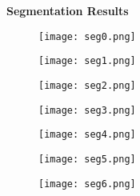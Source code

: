 \documentclass[conference]{IEEEtran}
\begin{document}
\section{}{\textbf{Segmentation Results}}

\begin{figure}[ht!]
    \centering
    \texttt{[image: seg0.png]}
\end{figure}

\begin{figure}[ht!]
    \centering
    \texttt{[image: seg1.png]}
\end{figure}

\begin{figure}[ht!]
    \centering
    \texttt{[image: seg2.png]}
\end{figure}
\begin{figure}[ht!]
    \centering
    \texttt{[image: seg3.png]}
\end{figure}
\begin{figure}[ht!]
    \centering
    \texttt{[image: seg4.png]}
\end{figure}
\begin{figure}[ht!]
    \centering
    \texttt{[image: seg5.png]}
\end{figure}
\begin{figure}[ht!]
    \centering
    \texttt{[image: seg6.png]}
\end{figure}
\end{document}
